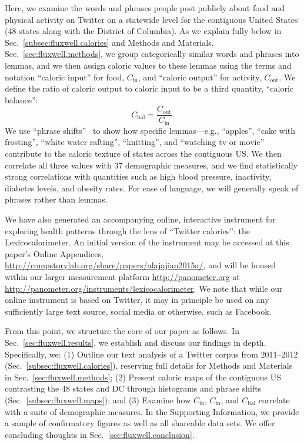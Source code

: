 \documentclass[10pt]{article}
\newcommand{\calin}{C_{\textrm{in}}}
\newcommand{\calout}{C_{\textrm{out}}}
\newcommand{\calbal}{C_{\textrm{bal}}}
\begin{document}
Here, we examine the words and phrases people post publicly about food and physical
activity on Twitter on a statewide level for the contiguous United
States (48 states along with the District of Columbia).
As we explain fully below
in Sec.~\ref{subsec:fluxwell.calories} 
and Methods and Materials, Sec.~\ref{sec:fluxwell.methods}, 
we group categorically similar words and phrases into lemmas,
and we then assign caloric values to these lemmas
using the terms and notation ``caloric input'' for food, $\calin$,
and ``caloric output'' for activity, $\calout$.
We define the ratio of caloric output to caloric input
to be a third quantity, ``caloric balance'':
\begin{equation}
  \calbal 
  = 
  \frac{\calout}{\calin}.
  \label{eq:fluxwell.calbal}
\end{equation}
We use ``phrase shifts''~\cite{dodds2011e} to show how 
specific
lemmas---e.g., ``apples'',
``cake with frosting'', 
``white water rafting'',
``knitting'',
and ``watching tv or movie''
contribute to the caloric texture of states across the contiguous US.
We then correlate all three values with 37
demographic measures, 
and we find statistically
strong correlations with quantities such as high blood pressure, inactivity,
diabetes levels, and obesity rates.
For ease of language, we will generally speak of 
phrases rather than lemmas.

We have also generated an accompanying online, interactive
instrument for exploring health patterns through the lens of ``Twitter
calories'': the Lexicocalorimeter.
An initial version of the instrument may be accessed at this paper's
Online Appendices,
\url{http://compstorylab.org/share/papers/alajajian2015a/},
and will be housed within our larger
measurement platform \url{http://panometer.org}
at 
\url{http://panometer.org/instruments/lexicocalorimeter}.
We note that while our online instrument is based on Twitter, it may in principle
be used on any sufficiently large text source, social media or
otherwise, such as Facebook.

From this point, we structure the core of our paper as follows.
In Sec.~\ref{sec:fluxwell.results},
we establish and discuss our findings in depth.
Specifically, we:
(1) Outline our text analysis of a Twitter corpus from 2011--2012
(Sec.~\ref{subsec:fluxwell.calories}),
reserving full details for Methods and Materials in Sec.~\ref{sec:fluxwell.methods};
(2) Present caloric maps of the contiguous US
contrasting the 48 states and DC
through histograms and phrase shifts
(Sec.~\ref{subsec:fluxwell.maps});
and 
(3) Examine how  $\calin$, $\calin$, and $\calbal$
correlate with a suite of demographic measures.
In the Supporting Information, 
we provide a sample of confirmatory figures 
as well as all shareable data sets.
We offer concluding thoughts in Sec.~\ref{sec:fluxwell.conclusion}.
\end{document}
